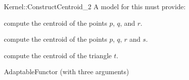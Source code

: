 \begin{ccRefFunctionObjectConcept}{Kernel::ConstructCentroid_2}
A model for this must provide:


 {compute the centroid of the points $p$, $q$, and $r$.}

 {compute the centroid of the points $p$, $q$, $r$ and $s$.}

 {compute the centroid of the triangle $t$.}

\ccRefines
AdaptableFunctor (with three arguments)

\ccSeeAlso
{} \\

\end{ccRefFunctionObjectConcept}
